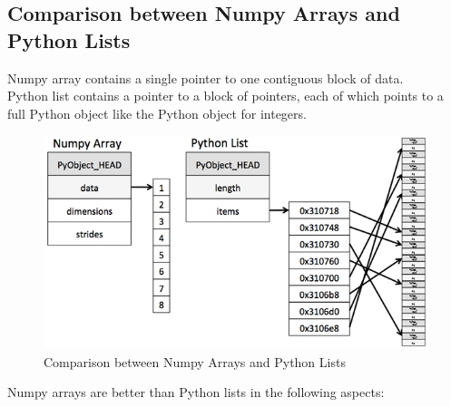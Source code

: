 \documentclass{book}
\begin{document}
\subsection{Comparison between Numpy Arrays and Python Lists}
Numpy array contains a single pointer to one contiguous block of data.\\
Python list contains a pointer to a block of pointers, each of which points to a full Python object like the Python object for integers.\\
\begin{figure}[h]
    \centering
    \includegraphics[scale=0.5]{chapter 2/ch2_figure8.jpeg}
    \caption{Comparison between Numpy Arrays and Python Lists}
\end{figure}
\newpage
Numpy arrays are better than Python lists in the following aspects:
\end{document}
